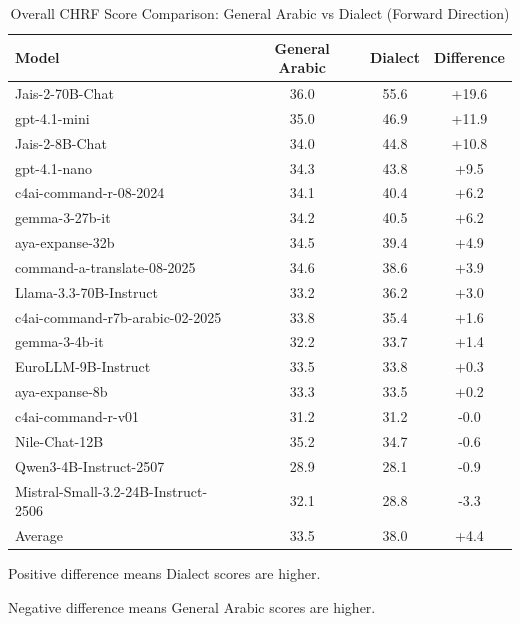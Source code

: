 \begin{table}[h]
\centering
\caption{Overall CHRF Score Comparison: General Arabic vs Dialect (Forward Direction)}
\label{tab:overall-general-dialect-difference}
\begin{tabular}{lccc}
\toprule
Model & General Arabic & Dialect & Difference \\
\midrule
Jais-2-70B-Chat & 36.0 & 55.6 & +19.6 \\
gpt-4.1-mini & 35.0 & 46.9 & +11.9 \\
Jais-2-8B-Chat & 34.0 & 44.8 & +10.8 \\
gpt-4.1-nano & 34.3 & 43.8 & +9.5 \\
c4ai-command-r-08-2024 & 34.1 & 40.4 & +6.2 \\
gemma-3-27b-it & 34.2 & 40.5 & +6.2 \\
aya-expanse-32b & 34.5 & 39.4 & +4.9 \\
command-a-translate-08-2025 & 34.6 & 38.6 & +3.9 \\
Llama-3.3-70B-Instruct & 33.2 & 36.2 & +3.0 \\
c4ai-command-r7b-arabic-02-2025 & 33.8 & 35.4 & +1.6 \\
gemma-3-4b-it & 32.2 & 33.7 & +1.4 \\
EuroLLM-9B-Instruct & 33.5 & 33.8 & +0.3 \\
aya-expanse-8b & 33.3 & 33.5 & +0.2 \\
c4ai-command-r-v01 & 31.2 & 31.2 & -0.0 \\
Nile-Chat-12B & 35.2 & 34.7 & -0.6 \\
Qwen3-4B-Instruct-2507 & 28.9 & 28.1 & -0.9 \\
Mistral-Small-3.2-24B-Instruct-2506 & 32.1 & 28.8 & -3.3 \\
\midrule
Average & 33.5 & 38.0 & +4.4 \\
\bottomrule
\end{tabular}
\begin{tablenotes}
\small
\item Positive difference means Dialect scores are higher.
\item Negative difference means General Arabic scores are higher.
\end{tablenotes}
\end{table}
